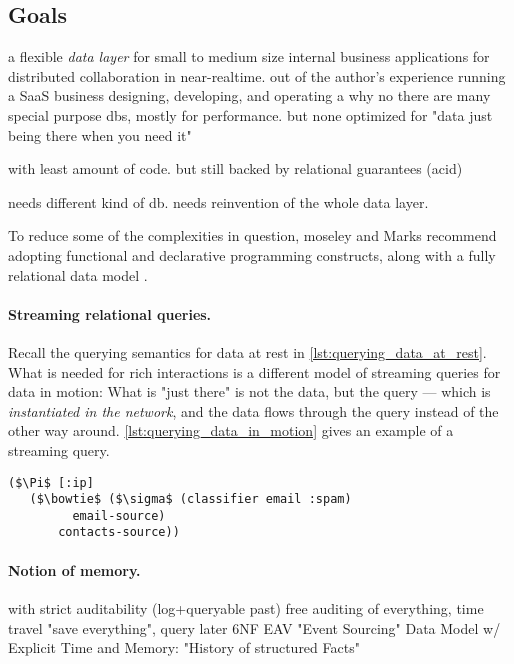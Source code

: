 \subsection{Goals}

a flexible \emph{data layer} for small to medium size internal business applications for distributed collaboration in near-realtime.
out of the author's experience running a SaaS business designing, developing, and operating a
why no there are many special purpose dbs, mostly for performance.
but none optimized for "data just being there when you need it"

with least amount of code. but still backed by relational guarantees (acid)

needs different kind of db.
needs reinvention of the whole data layer.



To reduce some of the complexities in question, moseley and Marks recommend adopting functional and declarative programming constructs, along with a fully relational data model \cite{tarpit}.

\paragraph{Streaming relational queries.}
Recall the querying semantics for data at rest in \autoref{lst:querying_data_at_rest}. What is needed for rich interactions is a different model of streaming queries for data in motion: What is "just there" is not the data, but the query — which is \emph{instantiated in the network}, and the data flows through the query instead of the other way around. \autoref{lst:querying_data_in_motion} gives an example of a streaming query.

\begin{lstlisting}[label={lst:querying_data_in_motion},morekeywords={email-source,contacts-source},caption=Querying data in motion \cite{alvaro2015isee}]
($\Pi$ [:ip]
   ($\bowtie$ ($\sigma$ (classifier email :spam)
         email-source)
       contacts-source))
\end{lstlisting}




\paragraph{Notion of memory.}
with strict auditability (log+queryable past)
free auditing of everything, time travel
"save everything", query later
6NF EAV "Event Sourcing" Data Model w/ Explicit Time and Memory: "History of structured Facts"

